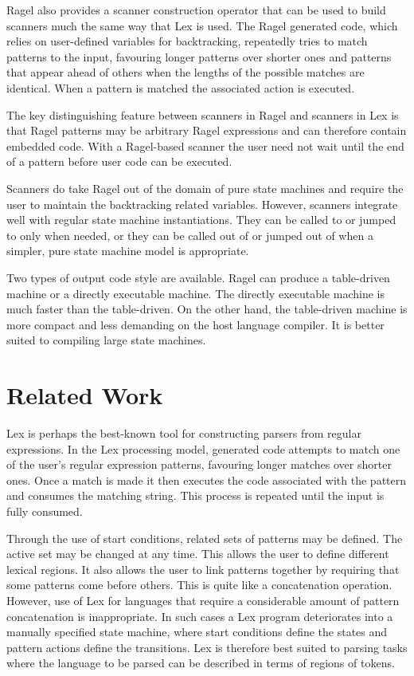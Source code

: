 \documentclass[letterpaper,11pt,oneside]{book}
\begin{document}
Ragel also provides a scanner construction operator that can be used to build
scanners much the same way that Lex is used. The Ragel generated code, which
relies on user-defined variables for backtracking, repeatedly tries to match
patterns to the input, favouring longer patterns over shorter ones and patterns
that appear ahead of others when the lengths of the possible matches are
identical. When a pattern is matched the associated action is executed. 

The key distinguishing feature between scanners in Ragel and scanners in Lex is
that Ragel patterns may be arbitrary Ragel expressions and can therefore
contain embedded code. With a Ragel-based scanner the user need not wait until
the end of a pattern before user code can be executed.

Scanners do take Ragel out of the domain of pure state machines and require the
user to maintain the backtracking related variables.  However, scanners
integrate well with regular state machine instantiations. They can be called to
or jumped to only when needed, or they can be called out of or jumped out of
when a simpler, pure state machine model is appropriate.

Two types of output code style are available. Ragel can produce a table-driven
machine or a directly executable machine. The directly executable machine is
much faster than the table-driven. On the other hand, the table-driven machine
is more compact and less demanding on the host language compiler. It is better
suited to compiling large state machines.

\section{Related Work}

Lex is perhaps the best-known tool for constructing parsers from regular
expressions. In the Lex processing model, generated code attempts to match one
of the user's regular expression patterns, favouring longer matches over
shorter ones. Once a match is made it then executes the code associated with
the pattern and consumes the matching string.  This process is repeated until
the input is fully consumed. 

Through the use of start conditions, related sets of patterns may be defined.
The active set may be changed at any time.  This allows the user to define
different lexical regions. It also allows the user to link patterns together by
requiring that some patterns come before others.  This is quite like a
concatenation operation. However, use of Lex for languages that require a
considerable amount of pattern concatenation is inappropriate. In such cases a
Lex program deteriorates into a manually specified state machine, where start
conditions define the states and pattern actions define the transitions.  Lex
is therefore best suited to parsing tasks where the language to be parsed can
be described in terms of regions of tokens. 
\end{document}
